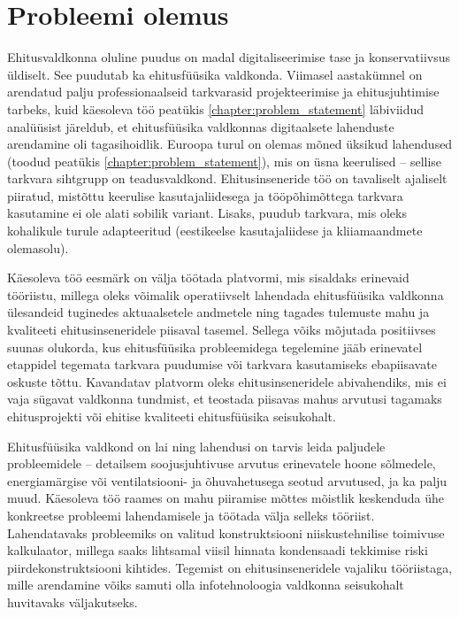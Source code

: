\section{Probleemi olemus}
\label{chapters:problem_statement}
Ehitusvaldkonna oluline puudus on madal digitaliseerimise tase \cite{digitalization_index} ja konservatiivsus üldiselt. See puudutab ka ehitusfüüsika valdkonda. 
Viimasel aastakümnel on  arendatud palju professionaalseid tarkvarasid projekteerimise ja ehitusjuhtimise tarbeks, kuid  käesoleva töö 
peatükis \ref{chapter:problem_statement} läbiviidud analüüsist järeldub, et ehitusfüüsika valdkonnas digitaalsete lahenduste arendamine oli tagasihoidlik. 
Euroopa turul on olemas mõned üksikud lahendused (toodud peatükis \ref{chapter:problem_statement}), mis on üsna keerulised -- sellise tarkvara sihtgrupp on teadusvaldkond.
Ehitusinseneride töö on tavaliselt ajaliselt piiratud, mistõttu keerulise kasutajaliidesega ja tööpõhimõttega tarkvara kasutamine ei ole alati sobilik variant. 
Lisaks, puudub tarkvara, mis oleks kohalikule turule adapteeritud (eestikeelse kasutajaliidese ja kliiamaandmete olemasolu).

Käesoleva töö eesmärk on välja töötada platvormi, mis sisaldaks erinevaid tööriistu, millega oleks võimalik operatiivselt lahendada ehitusfüüsika valdkonna ülesandeid
tuginedes aktuaalsetele andmetele ning tagades tulemuste mahu ja kvaliteeti ehitusinseneridele piisaval tasemel. 
Sellega võiks mõjutada positiivses suunas olukorda, kus ehitusfüüsika probleemidega tegelemine jääb erinevatel etappidel tegemata tarkvara puudumise või tarkvara kasutamiseks ebapiisavate oskuste tõttu. 
Kavandatav platvorm oleks ehitusinseneridele abivahendiks, mis ei vaja sügavat valdkonna tundmist, et teostada piisavas mahus arvutusi 
tagamaks ehitusprojekti või ehitise kvaliteeti ehitusfüüsika seisukohalt. 

Ehitusfüüsika valdkond on lai ning lahendusi on tarvis leida paljudele probleemidele -- detailsem soojusjuhtivuse arvutus erinevatele hoone sõlmedele,
energiamärgise või ventilatsiooni- ja õhuvahetusega seotud arvutused, ja ka palju muud. Käesoleva töö raames on mahu piiramise mõttes mõistlik
keskenduda ühe konkreetse probleemi lahendamisele ja töötada välja selleks tööriist. Lahendatavaks probleemiks on valitud konstruktsiooni
niiskustehnilise toimivuse kalkulaator, millega saaks lihtsamal viisil hinnata kondensaadi tekkimise riski piirdekonstruktsiooni kihtides.
Tegemist on ehitusinseneridele vajaliku tööriistaga, mille arendamine võiks samuti olla infotehnoloogia valdkonna seisukohalt
huvitavaks väljakutseks.

